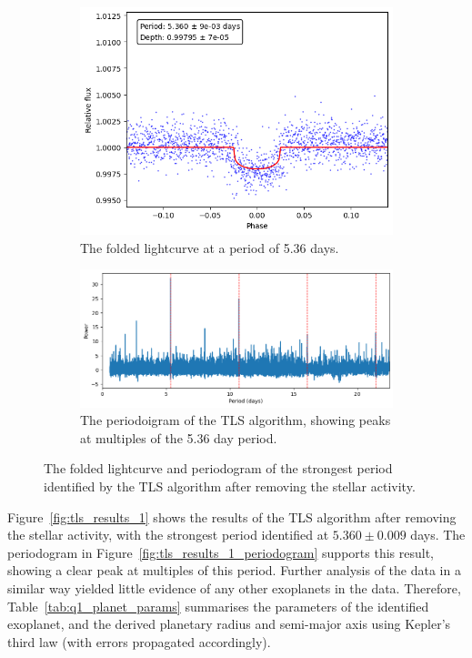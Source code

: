 \begin{figure}
\centering
\begin{subfigure}{0.5\textwidth}
    \centering
    \includegraphics[width=1\textwidth]{figures/tls_results_1}
    \caption{The folded lightcurve at a period of 5.36 days.}
    \label{fig:tls_results_1_folded}
\end{subfigure}%
\hfill
\begin{subfigure}{0.75\textwidth}
    \centering
    \includegraphics[width=1\textwidth]{./figures/tls_results_1_periodogram}
    \caption{The periodoigram of the TLS algorithm, showing peaks at multiples of the 5.36 day period.}
    \label{fig:tls_results_1_periodogram}
\end{subfigure}
\caption{The folded lightcurve and periodogram of the strongest period identified by the TLS algorithm after removing
the stellar activity.}
\label{fig:tls_results_1}
\end{figure}

Figure~\eqref{fig:tls_results_1} shows the results of the TLS algorithm after removing the stellar activity, with the strongest
period identified at $5.360 \pm 0.009$ days.
The periodogram in Figure~\eqref{fig:tls_results_1_periodogram} supports this result, showing a clear peak at multiples of this period.
Further analysis of the data in a similar way yielded little evidence of any other exoplanets in the data.
Therefore, Table~\eqref{tab:q1_planet_params} summarises the parameters of the identified exoplanet, and the derived
planetary radius and semi-major axis using Kepler's third law (with errors propagated accordingly).

